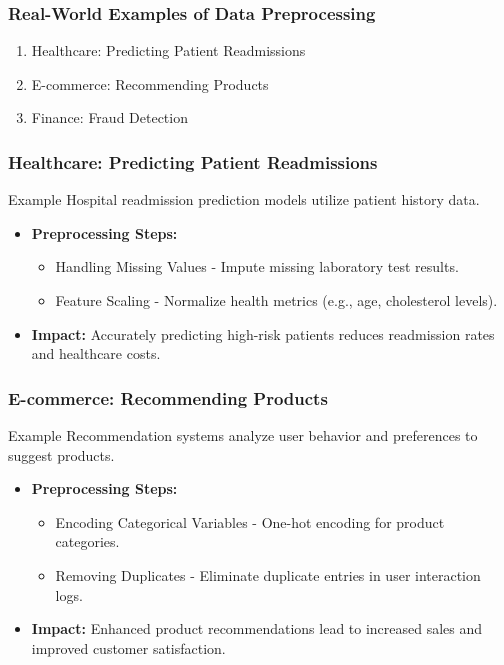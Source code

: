 \documentclass{beamer}
\begin{document}
\begin{frame}[fragile]
    \frametitle{Real-World Examples of Data Preprocessing}
    \begin{enumerate}
        \item Healthcare: Predicting Patient Readmissions
        \item E-commerce: Recommending Products
        \item Finance: Fraud Detection
    \end{enumerate}
\end{frame}

\begin{frame}[fragile]
    \frametitle{Healthcare: Predicting Patient Readmissions}
    \begin{block}{Example}
        Hospital readmission prediction models utilize patient history data.
    \end{block}
    \begin{itemize}
        \item \textbf{Preprocessing Steps:}
        \begin{itemize}
            \item Handling Missing Values - Impute missing laboratory test results.
            \item Feature Scaling - Normalize health metrics (e.g., age, cholesterol levels).
        \end{itemize}
        \item \textbf{Impact:} Accurately predicting high-risk patients reduces readmission rates and healthcare costs.
    \end{itemize}
\end{frame}

\begin{frame}[fragile]
    \frametitle{E-commerce: Recommending Products}
    \begin{block}{Example}
        Recommendation systems analyze user behavior and preferences to suggest products.
    \end{block}
    \begin{itemize}
        \item \textbf{Preprocessing Steps:}
        \begin{itemize}
            \item Encoding Categorical Variables - One-hot encoding for product categories.
            \item Removing Duplicates - Eliminate duplicate entries in user interaction logs.
        \end{itemize}
        \item \textbf{Impact:} Enhanced product recommendations lead to increased sales and improved customer satisfaction.
    \end{itemize}
\end{frame}
\end{document}
